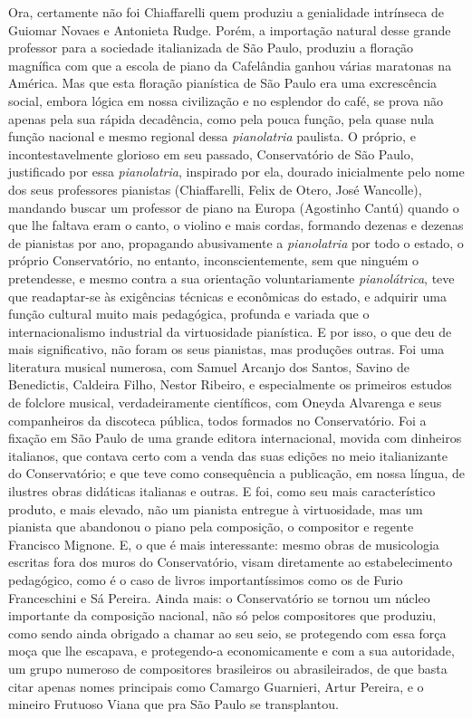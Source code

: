 Ora, certamente não foi Chiaffarelli quem produziu a genialidade
intrínseca de Guiomar Novaes e Antonieta Rudge. Porém, a importação
natural desse grande professor para a sociedade italianizada de São
Paulo, produziu a floração magnífica com que a escola de piano da
Cafelândia ganhou várias maratonas na América. Mas que esta floração
pianística de São Paulo era uma excrescência social, embora lógica em
nossa civilização e no esplendor do café, se prova não apenas pela sua
rápida decadência, como pela pouca função, pela quase nula função
nacional e mesmo regional dessa \textit{pianolatria} paulista. O próprio, e
incontestavelmente glorioso em seu passado, Conservatório de São Paulo,
justificado por essa \textit{pianolatria}, inspirado por ela, dourado
inicialmente pelo nome dos seus professores pianistas (Chiaffarelli,
Felix de Otero, José Wancolle), mandando buscar um professor de piano na
Europa (Agostinho Cantú) quando o que lhe faltava eram o canto, o
violino e mais cordas, formando dezenas e dezenas de pianistas por ano,
propagando abusivamente a \textit{pianolatria} por todo o estado, o próprio
Conservatório, no entanto, inconscientemente, sem que ninguém o
pretendesse, e mesmo contra a sua orientação voluntariamente
\textit{pianolátrica}, teve que readaptar-se às exigências técnicas e econômicas
do estado, e adquirir uma função cultural muito mais pedagógica,
profunda e variada que o internacionalismo industrial da virtuosidade
pianística. E por isso, o que deu de mais significativo, não foram os
seus pianistas, mas produções outras. Foi uma literatura musical
numerosa, com Samuel Arcanjo dos Santos, Savino de Benedictis, Caldeira
Filho, Nestor Ribeiro, e especialmente os primeiros estudos de folclore
musical, verdadeiramente científicos, com Oneyda Alvarenga e seus
companheiros da discoteca pública, todos formados no Conservatório. Foi
a fixação em São Paulo de uma grande editora internacional, movida com
dinheiros italianos, que contava certo com a venda das suas edições no
meio italianizante do Conservatório; e que teve como consequência a
publicação, em nossa língua, de ilustres obras didáticas italianas e
outras. E foi, como seu mais característico produto, e mais elevado, não
um pianista entregue à virtuosidade, mas um pianista que abandonou o
piano pela composição, o compositor e regente Francisco Mignone. E, o
que é mais interessante: mesmo obras de musicologia escritas fora dos
muros do Conservatório, visam diretamente ao estabelecimento pedagógico,
como é o caso de livros importantíssimos como os de Furio Franceschini e
Sá Pereira. Ainda mais: o Conservatório se tornou um núcleo importante da
composição nacional, não só pelos compositores que produziu, como sendo
ainda obrigado a chamar ao seu seio, se protegendo com essa força moça
que lhe escapava, e protegendo-a economicamente e com a sua autoridade,
um grupo numeroso de compositores brasileiros ou abrasileirados, de que
basta citar apenas nomes principais como Camargo Guarnieri, Artur
Pereira, e o mineiro Frutuoso Viana que pra São Paulo se transplantou.

